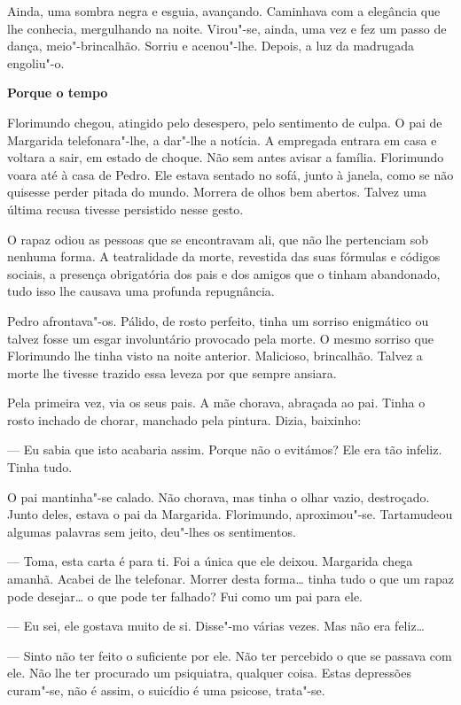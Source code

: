 Ainda, uma sombra negra e esguia, avançando. Caminhava com a elegância
que lhe conhecia, mergulhando na noite. Virou"-se, ainda, uma vez e fez
um passo de dança, meio"-brincalhão. Sorriu e acenou"-lhe. Depois, a luz
da madrugada engoliu"-o.

\vspace*{1.8cm}
\noindent{}\textbf{Porque o tempo}

Florimundo chegou, atingido pelo desespero, pelo sentimento de culpa. O
pai de Margarida telefonara"-lhe, a dar"-lhe a notícia. A empregada
entrara em casa e voltara a sair, em estado de choque. Não sem antes
avisar a família. Florimundo voara até à casa de Pedro. Ele estava
sentado no sofá, junto à janela, como se não quisesse perder pitada do
mundo. Morrera de olhos bem abertos. Talvez uma última recusa tivesse
persistido nesse gesto.

O rapaz odiou as pessoas que se encontravam ali, que não lhe pertenciam
sob nenhuma forma. A teatralidade da morte, revestida das suas fórmulas
e códigos sociais, a presença obrigatória dos pais e dos amigos que o
tinham abandonado, tudo isso lhe causava uma profunda repugnância.

Pedro afrontava"-os. Pálido, de rosto perfeito, tinha um sorriso
enigmático ou talvez fosse um esgar involuntário provocado pela morte. O
mesmo sorriso que Florimundo lhe tinha visto na noite anterior.
Malicioso, brincalhão. Talvez a morte lhe tivesse trazido essa leveza
por que sempre ansiara.

Pela primeira vez, via os seus pais. A mãe chorava, abraçada ao pai.
Tinha o rosto inchado de chorar, manchado pela pintura. Dizia, baixinho:

--- Eu sabia que isto acabaria assim. Porque não o evitámos? Ele era tão
infeliz. Tinha tudo.

O pai mantinha"-se calado. Não chorava, mas tinha o olhar vazio,
destroçado. Junto deles, estava o pai da Margarida. Florimundo,
aproximou"-se. Tartamudeou algumas palavras sem jeito, deu"-lhes os
sentimentos.

--- Toma, esta carta é para ti. Foi a única que ele deixou. Margarida
chega amanhã. Acabei de lhe telefonar. Morrer desta forma\ldots{} tinha
tudo o que um rapaz pode desejar\ldots{} o que pode ter falhado? Fui como um
pai para ele.

--- Eu sei, ele gostava muito de si. Disse"-mo várias vezes. Mas não era
feliz\ldots{}

--- Sinto não ter feito o suficiente por ele. Não ter percebido o que se
passava com ele. Não lhe ter procurado um psiquiatra, qualquer coisa.
Estas depressões curam"-se, não é assim, o suicídio é uma psicose,
trata"-se.

